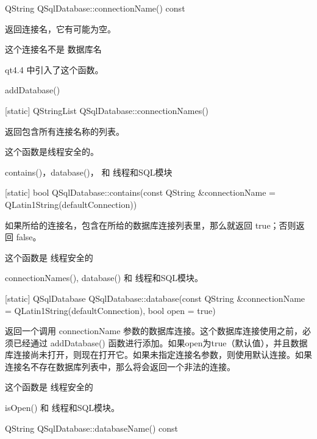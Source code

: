 QString QSqlDatabase::connectionName() const

返回连接名，它有可能为空。


\begin{notice}
这个连接名不是 数据库名
\end{notice}

qt4.4 中引入了这个函数。

\begin{seeAlso}
addDatabase()
\end{seeAlso}


[static] QStringList QSqlDatabase::connectionNames()

返回包含所有连接名称的列表。

\begin{notice}
这个函数是线程安全的。
\end{notice} 

\begin{seeAlso}
contains()，database()， 和 线程和SQL模块
\end{seeAlso}

[static] bool QSqlDatabase::contains(const QString \&connectionName = QLatin1String(defaultConnection))


如果所给的连接名，包含在所给的数据库连接列表里，那么就返回 true；否则返回 false。

\begin{notice}
这个函数是 线程安全的
\end{notice} 


\begin{seeAlso}
connectionNames(), database() 和 线程和SQL模块。
\end{seeAlso}


[static] QSqlDatabase QSqlDatabase::database(const QString \&connectionName = QLatin1String(defaultConnection), bool open = true)


返回一个调用 connectionName 参数的数据库连接。这个数据库连接使用之前，必须已经通过 addDatabase() 函数进行添加。如果open为true（默认值），并且数据库连接尚未打开，则现在打开它。如果未指定连接名参数，则使用默认连接。如果连接名不存在数据库列表中，那么将会返回一个非法的连接。

\begin{notice}
这个函数是 线程安全的
\end{notice}

\begin{seeAlso}
 isOpen() 和 线程和SQL模块。
\end{seeAlso}

QString QSqlDatabase::databaseName() const


